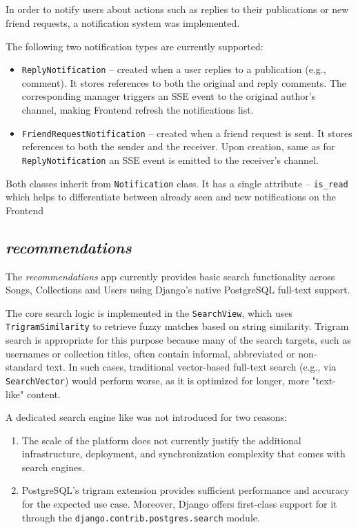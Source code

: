 \subsection{}\label{subsec:notif}
In order to notify users about actions such as replies to their publications
or new friend requests, a notification system was implemented.

The following two notification types are currently supported:
\begin{itemize}
    \item \texttt{ReplyNotification} – created when a user replies to a publication (e.g., comment).
    It stores references to both the original and reply comments. The corresponding manager triggers an SSE
    event to the original author's channel, making Frontend refresh the notifications list.
    \item \texttt{FriendRequestNotification} – created when a friend request is sent.
    It stores references to both the sender and the receiver. Upon creation, same as for \texttt{ReplyNotification}
    an SSE event is emitted to the receiver's channel.
\end{itemize}

Both classes inherit from \texttt{Notification} class. It has a single attribute -- \texttt{is\_read} which helps to
differentiate between already seen and new notifications on the Frontend

\subsection{\textit{recommendations}}
The \textit{recommendations} app currently provides basic search functionality across Songs,
Collections and Users using Django’s native PostgreSQL full-text support.

The core search logic is implemented in the \texttt{SearchView},
which uses \texttt{TrigramSimilarity} to retrieve fuzzy matches based on string similarity.
Trigram search is appropriate for this purpose because many
of the search targets, such as usernames or collection titles, often contain informal,
abbreviated or non-standard text.
In such cases, traditional vector-based full-text search
(e.g., via \texttt{SearchVector}) would perform worse, as it is optimized for longer,
more "text-like" content.

A dedicated search engine like  was not introduced for two reasons:
\begin{enumerate}
    \item The scale of the platform does not currently justify the additional
    infrastructure, deployment, and synchronization complexity that comes
    with search engines.
    \item PostgreSQL's trigram extension provides sufficient performance
    and accuracy for the expected use case.
    Moreover, Django offers first-class support for it
    through the \texttt{django.contrib.postgres.search} module.
\end{enumerate}

